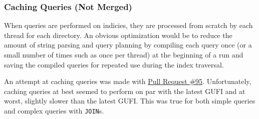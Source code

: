 \subsubsection{Caching Queries (Not Merged)}
When queries are performed on indicies, they are processed from
scratch by each thread for each directory. An obvious optimization
would be to reduce the amount of string parsing and query planning by
compiling each query once (or a small number of times such as once per
thread) at the beginning of a run and saving the compiled queries for
repeated use during the index traversal.

An attempt at caching queries was made with
\href{https://github.com/mar-file-system/GUFI/pull/95}{Pull Request
  \#95}. Unfortunately, caching queries at best seemed to perform on
par with the latest GUFI and at worst, slightly slower than the latest
GUFI. This was true for both simple queries and complex queries with
\texttt{JOIN}s.
